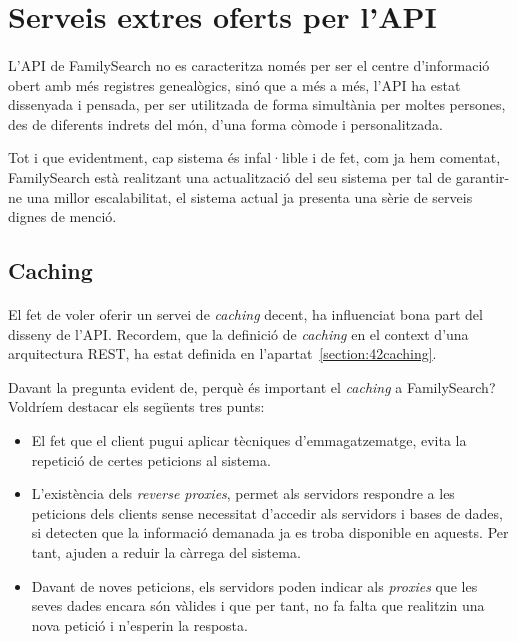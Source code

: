 \section{Serveis extres oferts per l'API}

    \paragraph{}
    L'API de FamilySearch no es caracteritza només per ser el centre d'informació obert amb més registres genealògics, sinó que a més a més, l'API ha estat dissenyada i pensada, per ser utilitzada de forma simultània per moltes persones, des de diferents indrets del món, d'una forma còmode i personalitzada.

    Tot i que evidentment, cap sistema és infal·lible i de fet, com ja hem comentat, FamilySearch està realitzant una actualització del seu sistema per tal de garantir-ne una millor escalabilitat, el sistema actual ja presenta una sèrie de serveis dignes de menció.

    \subsection{Caching}

        \paragraph{}
        El fet de voler oferir un servei de \emph{caching} decent, ha influenciat bona part del di\-sseny de l'API. Recordem, que la definició de \emph{caching} en el context d'una arquitectura REST, ha estat definida en l'apartat~\ref{section:42caching}.

        Davant la pregunta evident de, perquè és important el \emph{caching} a FamilySearch? Voldríem destacar els següents tres punts:

        \begin{itemize}
            \item El fet que el client pugui aplicar tècniques d'emmagatzematge, evita la repetició de certes peticions al sistema.
            \item L'existència dels \emph{reverse proxies}, permet als servidors respondre a les peticions dels clients sense necessitat d'accedir als servidors i bases de dades, si detecten que la informació demanada ja es troba disponible en aquests. Per tant, ajuden a reduir la càrrega del sistema.
            \item Davant de noves peticions, els servidors poden indicar als \emph{proxies} que les seves dades encara són vàlides i que per tant, no fa falta que realitzin una nova petició i n'esperin la resposta.
        \end{itemize}


